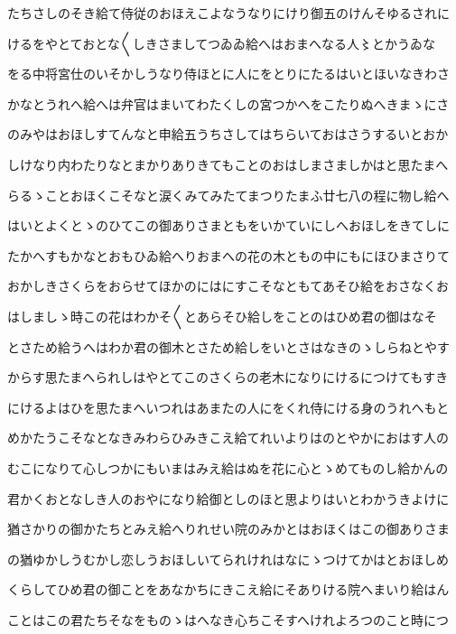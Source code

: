 \documentclass[a4paper,11pt,landscape]{ltjtarticle}
\begin{document}
\par\medskip
たちさしのそき給て侍従のおほえこよなうなりにけり御五のけんそゆるされに
\par\medskip
けるをやとておとな〱しきさましてつゐゐ給へはおまへなる人〻とかうゐな
\par\medskip
をる中将宮仕のいそかしうなり侍ほとに人にをとりにたるはいとほいなきわさ
\par\medskip
かなとうれへ給へは弁官はまいてわたくしの宮つかへをこたりぬへきまゝにさ
\par\medskip
のみやはおほしすてんなと申給五うちさしてはちらいておはさうするいとおか
\par\medskip
しけなり内わたりなとまかりありきてもことのおはしまさましかはと思たまへ
\par\medskip
らるゝことおほくこそなと涙くみてみたてまつりたまふ廿七八の程に物し給へ
\par\medskip
はいとよくとゝのひてこの御ありさまともをいかていにしへおほしをきてしに
\par\medskip
たかへすもかなとおもひゐ給へりおまへの花の木ともの中にもにほひまさりて
\par\medskip
おかしきさくらをおらせてほかのにはにすこそなともてあそひ給をおさなくお
\par\medskip
はしましゝ時この花はわかそ〱とあらそひ給しをことのはひめ君の御はなそ
\par\medskip
とさため給うへはわか君の御木とさため給しをいとさはなきのゝしらねとやす
\par\medskip
からす思たまへられしはやとてこのさくらの老木になりにけるにつけてもすき
\par\medskip
にけるよはひを思たまへいつれはあまたの人にをくれ侍にける身のうれへもと
\par\medskip
めかたうこそなとなきみわらひみきこえ給てれいよりはのとやかにおはす人の
\par\medskip
むこになりて心しつかにもいまはみえ給はぬを花に心とゝめてものし給かんの
\par\medskip
君かくおとなしき人のおやになり給御としのほと思よりはいとわかうきよけに
\par\medskip
猶さかりの御かたちとみえ給へりれせい院のみかとはおほくはこの御ありさま
\par\medskip
の猶ゆかしうむかし恋しうおほしいてられけれはなにゝつけてかはとおほしめ
\par\medskip
くらしてひめ君の御ことをあなかちにきこえ給にそありける院へまいり給はん
\par\medskip
ことはこの君たちそなをものゝはへなき心ちこそすへけれよろつのこと時につ
\end{document}
